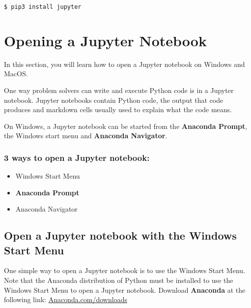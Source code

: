 \documentclass{book}
\begin{document}
\begin{lstlisting}
$ pip3 install jupyter
\end{lstlisting}
    




    
        \section{Opening a Jupyter Notebook}\label{opening-a-jupyter-notebook}
    




    
        In this section, you will learn how to open a Jupyter notebook on
Windows and MacOS.

One way problem solvers can write and execute Python code is in a
Jupyter notebook. Jupyter notebooks contain Python code, the output that
code produces and markdown cells usually used to explain what the code
means.

On Windows, a Jupyter notebook can be started from the \textbf{Anaconda
Prompt}, the Windows start menu and \textbf{Anaconda Navigator}.

\subsubsection{\texorpdfstring{3 ways to open a \textbf{Jupyter
notebook}:}{3 ways to open a Jupyter notebook:}}\label{ways-to-open-a-jupyter-notebook}

\begin{itemize}
\item
  Windows Start Menu
\item
  \textbf{Anaconda Prompt}
\item
  Anaconda Navigator
\end{itemize}
    




    
        \subsection{Open a Jupyter notebook with the Windows Start
Menu}\label{open-a-jupyter-notebook-with-the-windows-start-menu}
    




    
        One simple way to open a Jupyter notebook is to use the Windows Start
Menu. Note that the Anaconda distribution of Python must be installed to
use the Windows Start Menu to open a Jupyter notebook. Download
\textbf{Anaconda} at the following link:
\href{https://www.anaconda.com/download/}{Anaconda.com/downloads}
\end{document}
